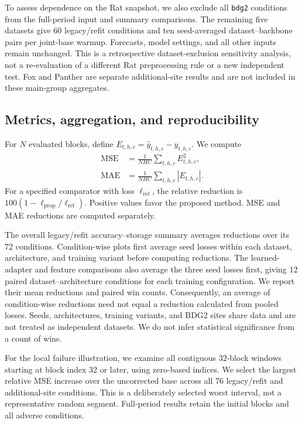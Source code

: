 To assess dependence on the Rat snapshot, we also exclude all \texttt{bdg2} conditions from the full-period input and summary comparisons. The remaining five datasets give 60 legacy/refit conditions and ten seed-averaged dataset--backbone pairs per joint-base warmup. Forecasts, model settings, and all other inputs remain unchanged. This is a retrospective dataset-exclusion sensitivity analysis, not a re-evaluation of a different Rat preprocessing rule or a new independent test. Fox and Panther are separate additional-site results and are not included in these main-group aggregates.

\subsection{Metrics, aggregation, and reproducibility}
For $N$ evaluated blocks, define $E_{t,h,c}=\widehat y_{t,h,c}-y_{t,h,c}$. We compute
\begin{equation}
 \begin{split}
 \operatorname{MSE}&=\frac{1}{NHC}\sum_{t,h,c}E_{t,h,c}^{2},\\
 \operatorname{MAE}&=\frac{1}{NHC}\sum_{t,h,c}|E_{t,h,c}|.
 \end{split}
 \label{eq:eval_metrics}
\end{equation}
For a specified comparator with loss $\ell_{\mathrm{ref}}$, the relative reduction is $100(1-\ell_{\mathrm{prop}}/\ell_{\mathrm{ref}})$. Positive values favor the proposed method. MSE and MAE reductions are computed separately.

The overall legacy/refit accuracy--storage summary averages reductions over its 72 conditions. Condition-wise plots first average seed losses within each dataset, architecture, and training variant before computing reductions. The learned-adapter and feature comparisons also average the three seed losses first, giving 12 paired dataset--architecture conditions for each training configuration. We report their mean reductions and paired win counts. Consequently, an average of condition-wise reductions need not equal a reduction calculated from pooled losses. Seeds, architectures, training variants, and BDG2 sites share data and are not treated as independent datasets. We do not infer statistical significance from a count of wins.

For the local failure illustration, we examine all contiguous 32-block windows starting at block index 32 or later, using zero-based indices. We select the largest relative MSE increase over the uncorrected base across all 76 legacy/refit and additional-site conditions. This is a deliberately selected worst interval, not a representative random segment. Full-period results retain the initial blocks and all adverse conditions.

